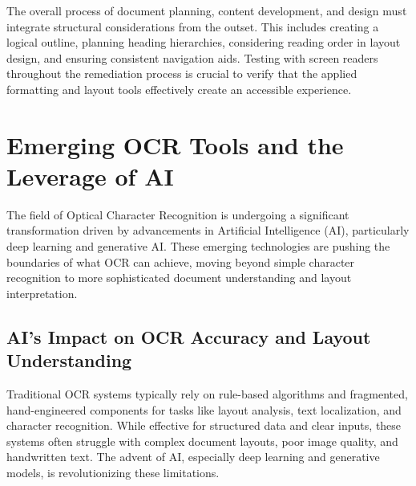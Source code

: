 The overall process of document planning, content development, and design must integrate structural considerations from the outset. This includes creating a logical outline, planning heading hierarchies, considering reading order in layout design, and ensuring consistent navigation aids. Testing with screen readers throughout the remediation process is crucial to verify that the applied formatting and layout tools effectively create an accessible experience.

\section{Emerging OCR Tools and the Leverage of AI}
\label{sec:ocr-ai-tools}

The field of Optical Character Recognition is undergoing a significant transformation driven by advancements in Artificial Intelligence (AI), particularly deep learning and generative AI. These emerging technologies are pushing the boundaries of what OCR can achieve, moving beyond simple character recognition to more sophisticated document understanding and layout interpretation.

\subsection{AI's Impact on OCR Accuracy and Layout Understanding}

Traditional OCR systems typically rely on rule-based algorithms and fragmented, hand-engineered components for tasks like layout analysis, text localization, and character recognition. While effective for structured data and clear inputs, these systems often struggle with complex document layouts, poor image quality, and handwritten text. The advent of AI, especially deep learning and generative models, is revolutionizing these limitations.

